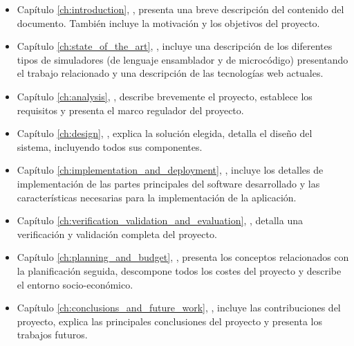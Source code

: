 \begin{itemize}

\item Capítulo \ref{ch:introduction}, \textit{}, presenta una breve descripción del contenido del documento. También incluye la motivación y los objetivos del proyecto.

\item Capítulo \ref{ch:state_of_the_art}, \textit{}, incluye una descripción de los diferentes tipos de simuladores (de lenguaje ensamblador y de microcódigo) presentando el trabajo relacionado y una descripción de las tecnologías web actuales.

\item Capítulo \ref{ch:analysis}, \textit{}, describe brevemente el proyecto, establece los requisitos y presenta el marco regulador del proyecto.

\item Capítulo \ref{ch:design}, \textit{}, explica la solución elegida, detalla el diseño del sistema, incluyendo todos sus componentes.

\item Capítulo \ref{ch:implementation_and_deployment}, \textit{}, incluye los detalles de implementación de las partes principales del software desarrollado y las características necesarias para la implementación de la aplicación.

\item Capítulo \ref{ch:verification_validation_and_evaluation}, \textit{}, detalla una verificación y validación completa del proyecto.

\item Capítulo \ref{ch:planning_and_budget}, \textit{}, presenta los conceptos relacionados con la planificación seguida, descompone todos los costes del proyecto y describe el entorno socio-económico.

\item Capítulo \ref{ch:conclusions_and_future_work}, \textit{}, incluye las contribuciones del proyecto, explica las principales conclusiones del proyecto y presenta los trabajos futuros.

\end{itemize}

